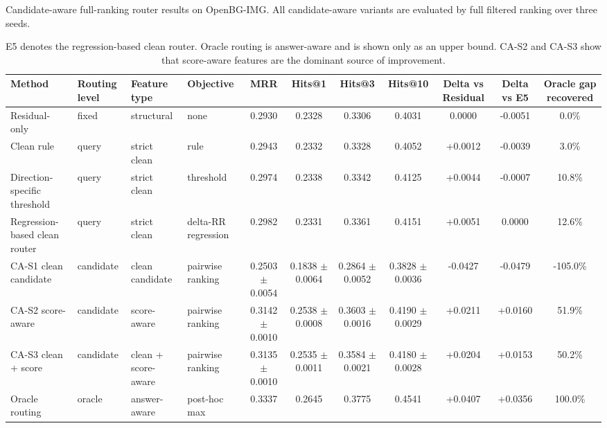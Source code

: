\begin{table}[t]
\centering
\small
\caption{Candidate-aware full-ranking router results on OpenBG-IMG. All candidate-aware variants are evaluated by full filtered ranking over three seeds.}
\label{tab:candidate_router_main_results}
\begin{tabular}{p{}p{}p{}p{}ccccccc}
\toprule
Method & Routing level & Feature type & Objective & MRR & Hits@1 & Hits@3 & Hits@10 & Delta vs Residual & Delta vs E5 & Oracle gap recovered \\
\midrule
Residual-only & fixed & structural & none & 0.2930 & 0.2328 & 0.3306 & 0.4031 & 0.0000 & -0.0051 & 0.0\% \\
Clean rule & query & strict clean & rule & 0.2943 & 0.2332 & 0.3328 & 0.4052 & +0.0012 & -0.0039 & 3.0\% \\
Direction-specific threshold & query & strict clean & threshold & 0.2974 & 0.2338 & 0.3342 & 0.4125 & +0.0044 & -0.0007 & 10.8\% \\
Regression-based clean router & query & strict clean & delta-RR regression & 0.2982 & 0.2331 & 0.3361 & 0.4151 & +0.0051 & 0.0000 & 12.6\% \\
CA-S1 clean candidate & candidate & clean candidate & pairwise ranking & 0.2503 $\pm$ 0.0054 & 0.1838 $\pm$ 0.0064 & 0.2864 $\pm$ 0.0052 & 0.3828 $\pm$ 0.0036 & -0.0427 & -0.0479 & -105.0\% \\
CA-S2 score-aware & candidate & score-aware & pairwise ranking & 0.3142 $\pm$ 0.0010 & 0.2538 $\pm$ 0.0008 & 0.3603 $\pm$ 0.0016 & 0.4190 $\pm$ 0.0029 & +0.0211 & +0.0160 & 51.9\% \\
CA-S3 clean + score & candidate & clean + score-aware & pairwise ranking & 0.3135 $\pm$ 0.0010 & 0.2535 $\pm$ 0.0011 & 0.3584 $\pm$ 0.0021 & 0.4180 $\pm$ 0.0028 & +0.0204 & +0.0153 & 50.2\% \\
Oracle routing & oracle & answer-aware & post-hoc max & 0.3337 & 0.2645 & 0.3775 & 0.4541 & +0.0407 & +0.0356 & 100.0\% \\
\bottomrule
\end{tabular}
\vspace{0.4ex}\caption*{\footnotesize E5 denotes the regression-based clean router. Oracle routing is answer-aware and is shown only as an upper bound. CA-S2 and CA-S3 show that score-aware features are the dominant source of improvement.}
\end{table}
